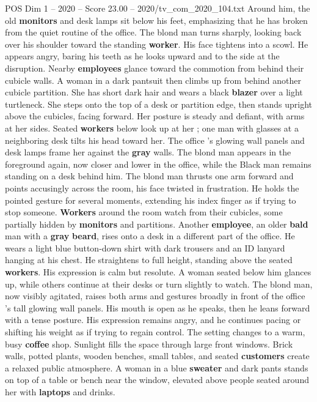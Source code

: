 \begin{textsample}{POS Dim 1 – 2020 – Score 23.00 – 2020/tv\_com\_2020\_104.txt}
Around him, the old \textbf{monitors} and desk lamps sit below his feet, emphasizing that he has broken from the quiet routine of the office.
The blond man turns sharply, looking back over his shoulder toward the standing \textbf{worker}.
His face tightens into a scowl.
He appears angry, baring his teeth as he looks upward and to the side at the disruption.
Nearby \textbf{employees} glance toward the commotion from behind their cubicle walls.
A woman in a dark pantsuit then climbs up from behind another cubicle partition.
She has short dark hair and wears a black \textbf{blazer} over a light turtleneck.
She steps onto the top of a desk or partition edge, then stands upright above the cubicles, facing forward.
Her posture is steady and defiant, with arms at her sides.
Seated \textbf{workers} below look up at her ; one man with glasses at a neighboring desk tilts his head toward her.
The office ’s glowing wall panels and desk lamps frame her against the \textbf{gray} walls.
The blond man appears in the foreground again, now closer and lower in the office, while the Black man remains standing on a desk behind him.
The blond man thrusts one arm forward and points accusingly across the room, his face twisted in frustration.
He holds the pointed gesture for several moments, extending his index finger as if trying to stop someone. \textbf{Workers} around the room watch from their cubicles, some partially hidden by \textbf{monitors} and partitions.
Another \textbf{employee}, an older \textbf{bald} man with a \textbf{gray} \textbf{beard}, rises onto a desk in a different part of the office.
He wears a light blue button-down shirt with dark trousers and an ID lanyard hanging at his chest.
He straightens to full height, standing above the seated \textbf{workers}.
His expression is calm but resolute.
A woman seated below him glances up, while others continue at their desks or turn slightly to watch.
The blond man, now visibly agitated, raises both arms and gestures broadly in front of the office ’s tall glowing wall panels.
His mouth is open as he speaks, then he leans forward with a tense posture.
His expression remains angry, and he continues pacing or shifting his weight as if trying to regain control.
The setting changes to a warm, busy \textbf{coffee} shop.
Sunlight fills the space through large front windows.
Brick walls, potted plants, wooden benches, small tables, and seated \textbf{customers} create a relaxed public atmosphere.
A woman in a blue \textbf{sweater} and dark pants stands on top of a table or bench near the window, elevated above people seated around her with \textbf{laptops} and drinks.

\end{textsample}
